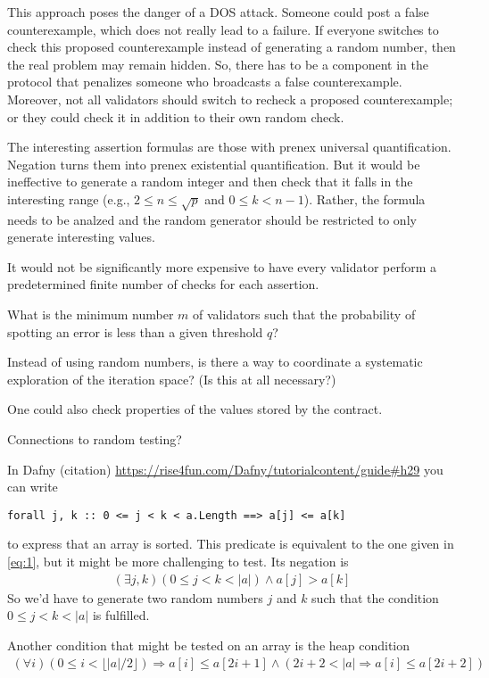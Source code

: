 \documentclass{article}
\begin{document}
This approach poses the danger of a DOS attack. Someone could post a false
counterexample, which does not really lead to a failure. If everyone switches to check
this proposed counterexample instead of generating a random number, then the real
problem may remain hidden. So, there has to be a component in the protocol that
penalizes someone who broadcasts a false counterexample. Moreover, not all validators
should switch to recheck a proposed counterexample; or they could check it in addition
to their own random check.

The interesting assertion formulas are those with prenex universal
quantification. Negation turns them into prenex existential quantification. But it
would be ineffective to generate a random integer and then check that it falls in the
interesting range (e.g., $2\le n \le \sqrt p$ and $0\le k< n-1$). Rather, the formula
needs to be analzed and the random generator should be restricted to only generate
interesting values. 

It would not be significantly more expensive to have every validator perform a
predetermined finite number of checks for each assertion.

What is the minimum number $m$ of validators such that the probability of spotting an
error is less than a given threshold $q$?

Instead of using random numbers, is there a way to coordinate a systematic exploration
of the iteration space? (Is this at all necessary?)

One could also check properties of the values stored by the contract.

Connections to random testing?

In Dafny (citation) \url{https://rise4fun.com/Dafny/tutorialcontent/guide#h29} you can
write
\begin{lstlisting}
forall j, k :: 0 <= j < k < a.Length ==> a[j] <= a[k]
\end{lstlisting}
to express that an array is sorted. This predicate is equivalent to the one given in
\eqref{eq:1}, but it might be more challenging to test. Its negation is
\begin{gather}
  \label{eq:2}
  (\exists j, k ) (0\le j< k < |a|) \wedge a[j] > a[k]
\end{gather}
So we'd have to generate two random numbers $j$ and $k$ such that the condition $0 \le
j < k < |a|$ is fulfilled.


Another condition that might be tested on an array is the heap condition
\begin{gather}
  \label{eq:3}
  (\forall i) (0 \le i < \lfloor|a|/2\rfloor) \Rightarrow a[i] \le a[2i+1] \wedge (2i+2
  < |a| \Rightarrow a[i] \le a[2i+2])
\end{gather}
\end{document}
